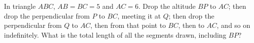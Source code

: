 In triangle $ABC$, $AB=BC=5$ and $AC=6$. Drop the altitude $BP$ to $AC$; then drop the perpendicular from $P$ to $BC$, meeting it at $Q$; then drop the perpendicular from $Q$ to $AC$, then from that point to $BC$, then to $AC$, and so on indefinitely. What is the total length of all the segments drawn, including $BP$?
